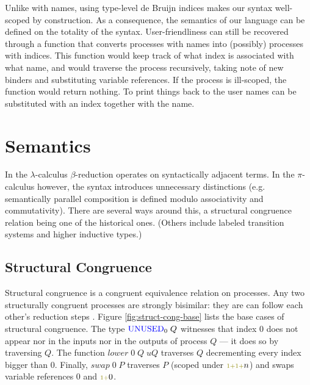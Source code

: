 \documentclass[a4paper,UKenglish,cleveref, autoref, thm-restate,authorcolumns]{lipics-v2019}
\theoremstyle{definition}
\newcommand{\lambdacalc}{$\lambda$-calculus}
\newcommand{\picalc}{$\pi$-calculus}
\newcommand{\type}[1]{\textcolor{blue}{\operatorname{#1}}}
\newcommand{\constr}[1]{\textcolor{olive}{\operatorname{#1}}}
\newcommand{\suc}{\constr{\scriptstyle 1+}}
\newcommand{\Unused}{\type{UNUSED}}
\begin{document}
Unlike with names, using type-level de Bruijn indices makes our syntax well-scoped by construction.
As a consequence, the semantics of our language can be defined on the totality of the syntax.
User-friendliness can still be recovered through a function that converts processes with names into (possibly) processes with indices.
This function would keep track of what index is associated with what name, and would traverse the process recursively, taking note of new binders and substituting variable references.
If the process is ill-scoped, the function would return nothing.
To print things back to the user names can be substituted with an index together with the name.

\section{Semantics}
\label{semantics}

In the \lambdacalc{} $\beta$-reduction operates on syntactically adjacent terms.
In the \picalc{} however, the syntax introduces unnecessary distinctions
(e.g. semantically parallel composition is defined modulo associativity and commutativity).
There are several ways around this, a structural congruence relation being one of the historical ones.
(Others include labeled transition systems and higher inductive types.)

\subsection{Structural Congruence}
\label{structural-congruence}

Structural congruence is a congruent equivalence relation on processes.
Any two structurally congruent processes are strongly bisimilar: they are can follow each other's reduction steps \cite{}.
Figure \ref{fig:struct-cong-base} lists the base cases of structural congruence.
The type $\Unused_0 \; Q$ witnesses that index $0$ does not appear nor in the inputs nor in the outputs of process $Q$ --- it does so by traversing $Q$.
The function $lower \; 0 \; Q \; uQ$ traverses $Q$ decrementing every index bigger than $0$.
Finally, $swap \; 0 \; P$ traverses $P$ (scoped under $\suc \suc n$) and swaps variable references $0$ and $\suc 0$.
\end{document}

